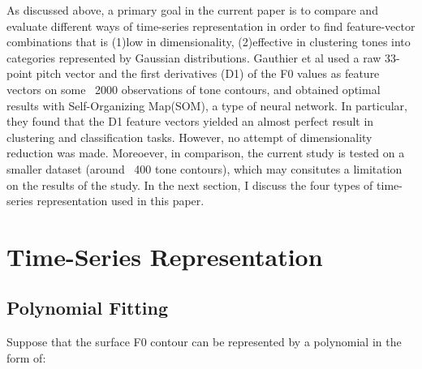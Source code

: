 \documentclass{article}
\begin{document}









As discussed above, a primary goal in the current paper is to compare and evaluate different ways of time-series representation in order to find feature-vector combinations that is (1)low in dimensionality, (2)effective in clustering tones into categories represented by Gaussian distributions. Gauthier et al \cite{gauthier:07} used a raw 33-point pitch vector and the first derivatives (D1) of the F0 values as feature vectors on some ~2000 observations of tone contours, and obtained optimal results with Self-Organizing Map(SOM), a type of neural network. In particular, they found that the D1 feature vectors yielded an almost perfect result in clustering and classification tasks. However, no attempt of dimensionality reduction was made. Moreoever, in comparison, the current study is tested on a smaller dataset (around ~400 tone contours), which may consitutes a limitation on the results of the study. In the next section, I discuss the four types of time-series representation used in this paper.

\section{Time-Series Representation}
\subsection{Polynomial Fitting}
Suppose that the surface F0 contour can be represented by a polynomial in the form of:
\end{document}
